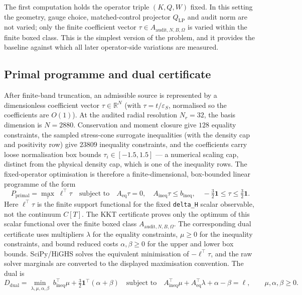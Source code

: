 \documentclass[11pt,a4paper]{article}
\begin{document}
The first computation holds the operator triple $(K,Q,W)$ fixed. In this setting the geometry, gauge choice, matched-control projector $Q_{\mathrm{LP}}$ and audit norm are not varied; only the finite coefficient vector $\tau\in A_{\mathrm{audit},N,B,\Omega}$ is varied within the finite boxed class. This is the simplest version of the problem, and it provides the baseline against which all later operator-side variations are measured.

\subsection{Primal programme and dual certificate}

After finite-band truncation, an admissible source is represented by a dimensionless coefficient vector $\tau\in\mathbb{R}^{N}$ (with $\tau=t/\varepsilon_{S}$, normalised so the coefficients are $O(1)$). At the audited radial resolution $N_{r}=32$, the basis dimension is $N=2880$. Conservation and moment closure give $128$ equality constraints, the sampled stress-cone surrogate inequalities (with the density cap and positivity row) give $23809$ inequality constraints, and the coefficients carry loose normalisation box bounds $\tau_{i}\in[-1.5,1.5]$ --- a numerical scaling cap, distinct from the physical density cap, which is one of the inequality rows. The fixed-operator optimisation is therefore a finite-dimensional, box-bounded linear programme of the form
\[
P_{\mathrm{primal}} = \max_{\tau}\;\ell^{\top}\tau
\quad \text{subject to} \quad
A_{\mathrm{eq}}\tau=0, \quad A_{\mathrm{ineq}}\tau\leq b_{\mathrm{ineq}}, \quad -\tfrac{3}{2}\mathbf{1}\leq\tau\leq\tfrac{3}{2}\mathbf{1}.
\]
Here $\ell^{\top}\tau$ is the finite support functional for the fixed \texttt{delta\_H} scalar observable, not the continuum $C[T]$. The KKT certificate proves only the optimum of this scalar functional over the finite boxed class $A_{\mathrm{audit},N,B,\Omega}$. The corresponding dual certificate uses multipliers $\lambda$ for the equality constraints, $\mu\geq0$ for the inequality constraints, and bound reduced costs $\alpha,\beta\geq0$ for the upper and lower box bounds. SciPy/HiGHS solves the equivalent minimisation of $-\ell^{\top}\tau$, and the raw solver marginals are converted to the displayed maximisation convention. The dual is
\[
D_{\mathrm{dual}} = \min_{\lambda,\mu,\alpha,\beta}\;
b_{\mathrm{ineq}}^{\top}\mu + \tfrac{3}{2}\mathbf{1}^{\top}(\alpha+\beta)
\quad \text{subject to} \quad
A_{\mathrm{ineq}}^{\top}\mu + A_{\mathrm{eq}}^{\top}\lambda + \alpha - \beta = \ell,
\qquad \mu,\alpha,\beta\geq0.
\]
\end{document}
